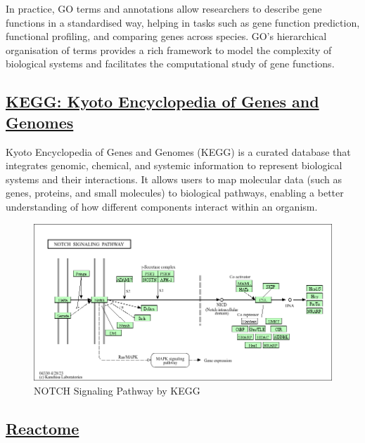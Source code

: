 \documentclass[
]{book}
\begin{document}
In practice, GO terms and annotations allow researchers to describe gene functions in a standardised way, helping in tasks such as gene function prediction, functional profiling, and comparing genes across species. GO's hierarchical organisation of terms provides a rich framework to model the complexity of biological systems and facilitates the computational study of gene functions.

\hypertarget{kegg-kyoto-encyclopedia-of-genes-and-genomes}{%
\subsection{\texorpdfstring{\href{https://www.genome.jp/kegg/}{KEGG: Kyoto Encyclopedia of Genes and Genomes}}{KEGG: Kyoto Encyclopedia of Genes and Genomes}}\label{kegg-kyoto-encyclopedia-of-genes-and-genomes}}

Kyoto Encyclopedia of Genes and Genomes (KEGG) is a curated database that integrates genomic, chemical, and systemic information to represent biological systems and their interactions. It allows users to map molecular data (such as genes, proteins, and small molecules) to biological pathways, enabling a better understanding of how different components interact within an organism.

\begin{figure}

{\centering \includegraphics[width=1\linewidth]{images/NOTCH_signaling_pathway_kegg} 

}

\caption{NOTCH Signaling Pathway by KEGG}\label{fig:unnamed-chunk-8}
\end{figure}

\hypertarget{reactome}{%
\subsection{\texorpdfstring{\href{https://reactome.org/}{Reactome}}{Reactome}}\label{reactome}}
\end{document}
